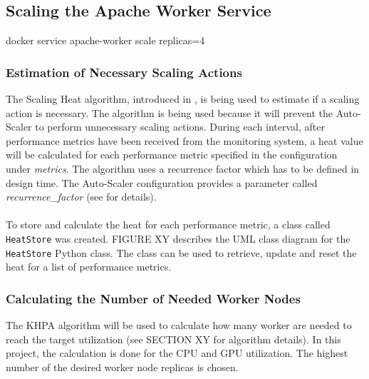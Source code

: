 \subsection{Scaling the Apache Worker Service}
docker service apache-worker scale replicas=4


\subsubsection{Estimation of Necessary Scaling Actions}

%
%

The Scaling Heat algorithm, introduced in , is being used to estimate if a scaling action is necessary.
The algorithm is being used because it will prevent the Auto-Scaler to perform unnecessary scaling actions.
During each interval, after performance metrics have been received from the monitoring system, a heat value will be calculated for each performance metric specified in the configuration under \textit{metrics}.
The algorithm uses a recurrence factor which has to be defined in design time. The Auto-Scaler configuration provides a parameter called \textit{recurrence\_factor} (see  for details). 


\paragraph{}To store and calculate the heat for each performance metric, a class called \texttt{HeatStore} was created.
FIGURE XY describes the UML class diagram for the \texttt{HeatStore} Python class.
The class can be used to retrieve, update and reset the heat for a list of performance metrics.


\subsubsection{Calculating the Number of Needed Worker Nodes}

%
%


The KHPA algorithm will be used to calculate how many worker are needed to reach the target utilization (see SECTION XY for algorithm details). 
In this project, the calculation is done for the CPU and GPU utilization. The highest number of the desired worker node replicas is chosen.


